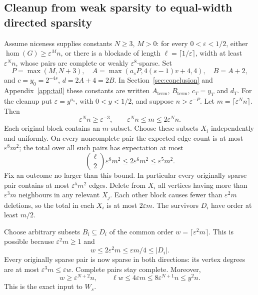 \documentclass[11pt,a4paper]{article}
\theoremstyle{definition}
\theoremstyle{remark}
\numberwithin{equation}{section}
\begin{document}
\subsection{Cleanup from weak sparsity to equal-width directed sparsity}
Assume niceness supplies constants \(N\ge3\), \(M>0\): for every \(0<\varepsilon<1/2\), either \(\hom(G)\ge\varepsilon^M n\), or there is a blockade of length \(\ell=\lceil1/\varepsilon\rceil\), width at least \(\varepsilon^N n\), whose pairs are complete or weakly \(\varepsilon^8\)-sparse. Set
\begin{equation}\label{eq:term-constants}
 P=\max(M,N+3),\quad
 A=\max(a_sP,4(s-1)v+4,4),\quad B=A+2,
\end{equation}
and \(c=y_0=2^{-4s}\), \(d=2A+4=2B\). In Section~\ref{sec:conclusion} and Appendix~\ref{app:tail} these constants are written \(A_{\mathrm{term}}\), \(B_{\mathrm{term}}\), \(c_{T}=y_{T}\) and \(d_{T}\). For the cleanup put \(\varepsilon=y^{a_s}\), with \(0<y<1/2\), and suppose \(n>\varepsilon^{-P}\). Let \(m=\lceil\varepsilon^Nn\rceil\). Then
\[
 \varepsilon^Nn\ge\varepsilon^{-3},\qquad
 \varepsilon^Nn\le m\le2\varepsilon^Nn.
\]
Each original block contains an \(m\)-subset. Choose these subsets \(X_i\) independently and uniformly. On every noncomplete pair the expected edge count is at most \(\varepsilon^8m^2\); the total over all such pairs has expectation at most
\[
 \binom\ell2\varepsilon^8m^2\le2\varepsilon^6m^2\le\varepsilon^5m^2.
\]
Fix an outcome no larger than this bound. In particular every originally sparse pair contains at most \(\varepsilon^5m^2\) edges. Delete from \(X_i\) all vertices having more than \(\varepsilon^3m\) neighbours in any relevant \(X_j\). Each other block causes fewer than \(\varepsilon^2m\) deletions, so the total in each \(X_i\) is at most \(2\varepsilon m\). The survivors \(D_i\) have order at least \(m/2\).

Choose arbitrary subsets \(B_i\subseteq D_i\) of the common order
\(w=\lceil\varepsilon^2m\rceil\). This is possible because \(\varepsilon^2m\ge1\) and
\[
 w\le2\varepsilon^2m\le\varepsilon m/4\le|D_i|.
\]
Every originally sparse pair is now sparse in both directions: its vertex degrees are at most \(\varepsilon^3m\le\varepsilon w\). Complete pairs stay complete. Moreover,
\[
 w\ge\varepsilon^{N+2}n,\qquad
 \ell w\le4\varepsilon m\le8\varepsilon^{N+1}n\le y^2n.
\]
This is the exact input to \(W_s\).
\end{document}
